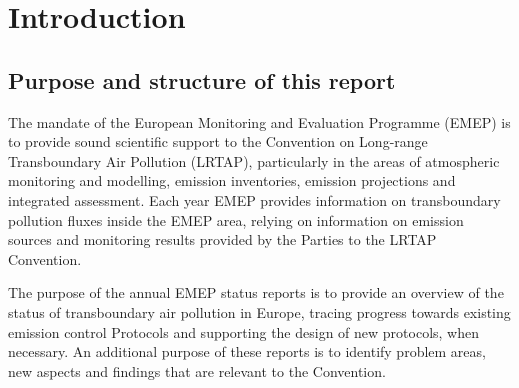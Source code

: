 \chapter[Introduction]{Introduction}
\label{ch:Intro}


\section{Purpose and structure of this report}

The mandate of the European Monitoring and Evaluation Programme (EMEP)
is to provide sound scientific support to the Convention on Long-range
Transboundary Air Pollution (LRTAP), particularly in the areas of
atmospheric monitoring and modelling, emission inventories, emission
projections and integrated assessment. Each year EMEP provides
information on transboundary pollution fluxes inside the
EMEP area, relying on information on emission sources and
monitoring results provided by the Parties to the LRTAP Convention.

The purpose of the annual EMEP status reports is to provide an
overview of the status of transboundary air pollution in Europe,
tracing progress towards existing emission control Protocols and
supporting the design of new protocols, when necessary. An additional
purpose of these reports is to identify problem areas, new aspects
and findings that are relevant to the Convention.




